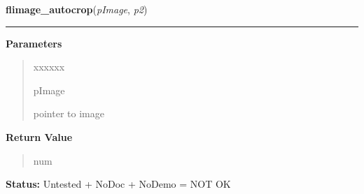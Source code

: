 \hspace{.8\funcindent}\begin{boxedminipage}{\funcwidth}

    \raggedright \textbf{flimage\_autocrop}(\textit{pImage}, \textit{p2})

    \vspace{-1.5ex}

    \rule{\textwidth}{0.5\fboxrule}
\setlength{\parskip}{2ex}
\setlength{\parskip}{1ex}
      \textbf{Parameters}
      \vspace{-1ex}

      \begin{quote}
        \begin{Ventry}{xxxxxx}

          \item[pImage]

          pointer to image

        \end{Ventry}

      \end{quote}

      \textbf{Return Value}
    \vspace{-1ex}

      \begin{quote}
      num

      \end{quote}

\textbf{Status:} Untested + NoDoc + NoDemo = NOT OK



    \end{boxedminipage}

    \label{xformslib:flflimage:flimage_get_autocrop}

    \vspace{0.5ex}


